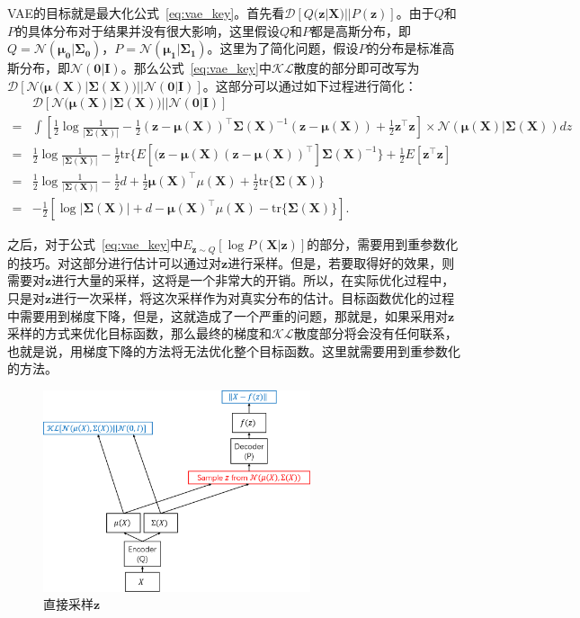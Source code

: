 VAE的目标就是最大化公式~\ref{eq:vae_key}。首先看$\mathcal D{[Q(\bm z|\bm X)||P(\bm z)]}$。由于$Q$和$P$的具体分布对于结果并没有很大影响，这里假设$Q$和$P$都是高斯分布，即$Q=\mathcal N(\bm {\mu_0}|\bm {\Sigma_0})$，$P=\mathcal N(\bm {\mu_1}|\bm {\Sigma_1})$。这里为了简化问题，假设$P$的分布是标准高斯分布，即$\mathcal N(\bm 0|\bm I)$。那么公式~\ref{eq:vae_key}中$\mathcal{KL}$散度的部分即可改写为$\mathcal D{[\mathcal N(\bm \mu(\bm X)|\bm \Sigma(\bm X))||\mathcal N(\bm 0|\bm I)]}$。这部分可以通过如下过程进行简化：
\begin{equation}
\label{eq:KL_infer}
\begin{aligned}
  &\mathcal D{[\mathcal N(\bm \mu(\bm X)|\bm \Sigma(\bm X))||\mathcal N(\bm 0|\bm I)]} \\
= &\int {[\frac{1}{2}\log \frac{1}{|\bm \Sigma(\bm X)|} - \frac{1}{2}(\bm z - \bm \mu (\bm X))^\top \bm \Sigma(\bm X)^{-1}(\bm z - \bm \mu (\bm X)) + \frac{1}{2}\bm z^\top\bm z]}\times \mathcal N(\bm \mu(\bm X)|\bm \Sigma(\bm X))dz \\
= &\frac{1}{2}\log \frac{1}{|\bm \Sigma(\bm X)|}-\frac{1}{2}\mathrm{tr}\{E{[(\bm z - \bm \mu (\bm X)(\bm z - \bm \mu (\bm X))^\top]\bm \Sigma(\bm X)^{-1}}\} + \frac{1}{2}E{[\bm z^\top\bm z]} \\
= &\frac{1}{2}\log \frac{1}{|\bm \Sigma(\bm X)|}-\frac{1}{2}d + \frac{1}{2}\bm \mu (\bm X)^\top\mu (\bm X) + \frac{1}{2}\mathrm{tr}\{\bm \Sigma(\bm X)\} \\
= &-\frac{1}{2}{[\log |\bm \Sigma(\bm X)| + d - \bm \mu (\bm X)^\top\mu (\bm X) - \mathrm{tr}\{\bm \Sigma(\bm X)\}]}.
\end{aligned}
\end{equation}
\par
之后，对于公式~\ref{eq:vae_key}中$E_{\bm z\sim Q}{[\log P(\bm X|\bm z)]}$的部分，需要用到重参数化的技巧。对这部分进行估计可以通过对$\bm z$进行采样。但是，若要取得好的效果，则需要对$\bm z$进行大量的采样，这将是一个非常大的开销。所以，在实际优化过程中，只是对$\bm z$进行一次采样，将这次采样作为对真实分布的估计。目标函数优化的过程中需要用到梯度下降，但是，这就造成了一个严重的问题，那就是，如果采用对$\bm z$采样的方式来优化目标函数，那么最终的梯度和$\mathcal{KL}$散度部分将会没有任何联系，也就是说，用梯度下降的方法将无法优化整个目标函数。这里就需要用到重参数化的方法。\par
\begin{figure}[h]
  \centering
  \includegraphics[width=0.7\textwidth]{noreparam.png}
  \caption{直接采样$\bm z$}
  \label{fig:noreparam}
\end{figure}

